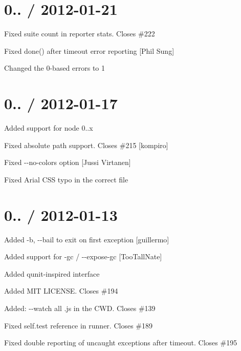 \section*{0.. / 2012-\/01-\/21}


\begin{DoxyItemize}
\item Fixed suite count in reporter stats. Closes \#222
\item Fixed {\ttfamily done()} after timeout error reporting \mbox{[}Phil Sung\mbox{]}
\item Changed the 0-\/based errors to 1
\end{DoxyItemize}

\section*{0.. / 2012-\/01-\/17}


\begin{DoxyItemize}
\item Added support for node 0..\+x
\item Fixed absolute path support. Closes \#215 \mbox{[}kompiro\mbox{]}
\item Fixed {\ttfamily -\/-\/no-\/colors} option \mbox{[}Jussi Virtanen\mbox{]}
\item Fixed Arial C\+SS typo in the correct file
\end{DoxyItemize}

\section*{0.. / 2012-\/01-\/13}


\begin{DoxyItemize}
\item Added {\ttfamily -\/b, -\/-\/bail} to exit on first exception \mbox{[}guillermo\mbox{]}
\item Added support for {\ttfamily -\/gc} / {\ttfamily -\/-\/expose-\/gc} \mbox{[}Too\+Tall\+Nate\mbox{]}
\item Added {\ttfamily qunit}-\/inspired interface
\item Added M\+IT L\+I\+C\+E\+N\+SE. Closes \#194
\item Added\+: {\ttfamily -\/-\/watch} all .js in the C\+WD. Closes \#139
\item Fixed {\ttfamily self.\+test} reference in runner. Closes \#189
\item Fixed double reporting of uncaught exceptions after timeout. Closes \#195
\end{DoxyItemize}

